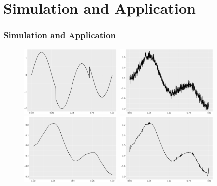 \documentclass{beamer}
\begin{document}
\section{Simulation and Application}

\begin{frame}
\frametitle{Simulation and Application}
\begin{figure}
\centering
\includegraphics[width=5cm,height=3.5cm]{../Chapters/02TractorSplineTheory/plot/ggplot/ggHeaviSine.pdf}
\includegraphics[width=5cm,height=3.5cm]{../Chapters/02TractorSplineTheory/plot/ggplot/ggHeaviSinePositionNoise}\\
\includegraphics[width=5cm,height=3.5cm]{../Chapters/02TractorSplineTheory/plot/ggplot/ggHeaviSinePSpline}
\includegraphics[width=5cm,height=3.5cm]{../Chapters/02TractorSplineTheory/plot/ggplot/ggHeaviSineSure}
\end{figure}
\end{frame}
\end{document}
